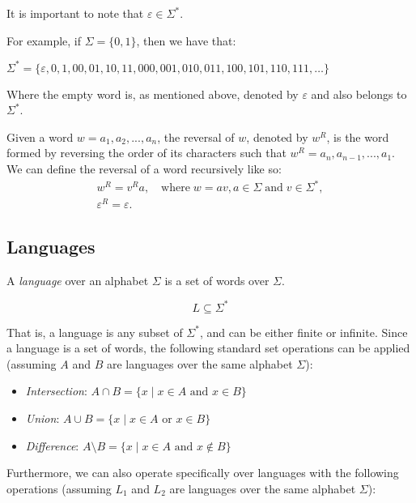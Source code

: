 It is important to note that $\varepsilon \in \Sigma^*$.

For example, if $\Sigma = \{ 0, 1 \}$, then we have that:
\begin{center}
	$\Sigma^* = \{ \varepsilon, 0, 1, 00, 01, 10, 11, 000, 001, 010, 011, 100, 101, 110, 111, \ldots \}$
\end{center}

Where the empty word is, as mentioned above, denoted by $\varepsilon$ and also belongs to $\Sigma^*$.



Given a word $w = a_1, a_2, ..., a_n$, the reversal of $w$, denoted by $w^R$, is the word formed by reversing the order of its characters such that $w^R = a_n, a_{n-1}, ..., a_1$. We can define the reversal of a word recursively like so:
\begin{gather*}
	w^R = v^Ra, \quad \text{where} \; w=av, a \in \Sigma \; \text{and} \; v \in \Sigma^*, \\
	\varepsilon^R = \varepsilon.
\end{gather*}

\subsection*{Languages}

A \emph{language} over an alphabet $\Sigma$ is a set of words over $\Sigma$.

\[
L \subseteq \Sigma^*
\]

That is, a language is any subset of $\Sigma^*$, and can be either finite or infinite. \newline
Since a language is a set of words, the following standard set operations can be applied (assuming $A$ and $B$ are languages over the same alphabet $\Sigma$):

\begin{itemize}
	\item \emph{Intersection}: $A \cap B = \{ x \mid x \in A \text{ and } x \in B \}$
	\item \emph{Union}: $A \cup B = \{ x \mid x \in A \text{ or } x \in B \}$
	\item \emph{Difference}: $A \setminus B = \{ x \mid x \in A \text{ and } x \notin B \}$
\end{itemize}

Furthermore, we can also operate specifically over languages with the following operations (assuming $L_1$ and $L_2$ are languages over the same alphabet $\Sigma$):

